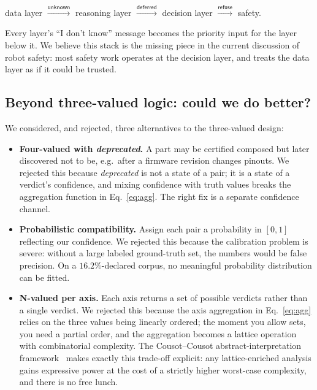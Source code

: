 \documentclass[11pt,twocolumn]{article}
\begin{document}
\begin{center}
data layer $\xrightarrow{\mathsf{unknown}}$
reasoning layer $\xrightarrow{\mathsf{deferred}}$
decision layer $\xrightarrow{\mathsf{refuse}}$
safety.
\end{center}

Every layer's ``I don't know'' message becomes the priority input
for the layer below it. We believe this stack is the missing piece
in the current discussion of robot safety: most safety work
operates at the decision layer, and treats the data layer as if
it could be trusted.

\subsection{Beyond three-valued logic: could we do better?}

We considered, and rejected, three alternatives to the three-valued
design:

\begin{itemize}[nosep,leftmargin=*]
\item \textbf{Four-valued with \emph{deprecated}.} A part may
be certified composed but later discovered not to be, e.g.\ after
a firmware revision changes pinouts. We rejected this because
\emph{deprecated} is not a state of a pair; it is a state of a
verdict's confidence, and mixing confidence with truth values
breaks the aggregation function in Eq.~\eqref{eq:agg}. The right
fix is a separate confidence channel.

\item \textbf{Probabilistic compatibility.} Assign each pair a
probability in $[0, 1]$ reflecting our confidence. We rejected
this because the calibration problem is severe: without a large
labeled ground-truth set, the numbers would be false precision.
On a $16.2\%$-declared corpus, no meaningful probability
distribution can be fitted.

\item \textbf{N-valued per axis.} Each axis returns a set of
possible verdicts rather than a single verdict. We rejected this
because the axis aggregation in Eq.~\eqref{eq:agg} relies on the
three values being linearly ordered; the moment you allow sets,
you need a partial order, and the aggregation becomes a lattice
operation with combinatorial complexity. The Cousot--Cousot
abstract-interpretation framework~\cite{Cousot2004,Cousot2018}
makes exactly this trade-off explicit: any lattice-enriched
analysis gains expressive power at the cost of a strictly higher
worst-case complexity, and there is no free lunch.
\end{itemize}
\end{document}

